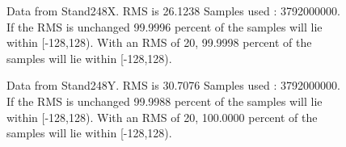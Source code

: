\begin{figure}[h] 				 				 				\caption{Data from Stand248X. RMS is 26.1238 Samples used : 3792000000. If the RMS is unchanged 99.9996 percent of the samples will lie within [-128,128).  				 With an RMS of 20, 99.9998 percent of the samples will lie within [-128,128).} 				\end{figure} 

\begin{figure}[h] 				 				 				\caption{Data from Stand248Y. RMS is 30.7076 Samples used : 3792000000. If the RMS is unchanged 99.9988 percent of the samples will lie within [-128,128).  				 With an RMS of 20, 100.0000 percent of the samples will lie within [-128,128).} 				\end{figure} 

